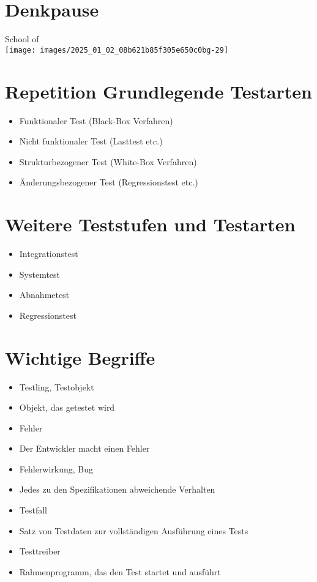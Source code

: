 \documentclass[10pt]{article}
\begin{document}
\section*{Denkpause}
School of\\
\texttt{[image: images/2025\_01\_02\_08b621b85f305e650c0bg-29]}

\section*{Repetition Grundlegende Testarten}
\begin{itemize}
  \item Funktionaler Test (Black-Box Verfahren)
  \item Nicht funktionaler Test (Lasttest etc.)
  \item Strukturbezogener Test (White-Box Verfahren)
  \item Änderungsbezogener Test (Regressionstest etc.)
\end{itemize}

\section*{Weitere Teststufen und Testarten}
\begin{itemize}
  \item Integrationstest
  \item Systemtest
  \item Abnahmetest
  \item Regressionstest
\end{itemize}

\section*{Wichtige Begriffe}
\begin{itemize}
  \item Testling, Testobjekt
  \item Objekt, das getestet wird
  \item Fehler
  \item Der Entwickler macht einen Fehler
  \item Fehlerwirkung, Bug
  \item Jedes zu den Spezifikationen abweichende Verhalten
  \item Testfall
  \item Satz von Testdaten zur vollständigen Ausführung eines Tests
  \item Testtreiber
  \item Rahmenprogramm, das den Test startet und ausführt
\end{itemize}
\end{document}
